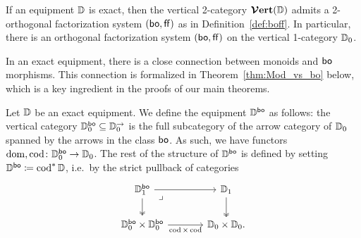 \documentclass[11pt,oneside,article]{memoir}
\begin{document}
\begin{theorem}\cite[Theorem~4.17]{Schultz2015}
    \label{thm:orthogonal}
  If an equipment $\mathbb{D}$ is exact, then the vertical 2-category $\bm{\mathcal{V}}\mathbf{ert}(\mathbb{D})$ admits a
  2-orthogonal factorization system $(\mathsf{bo},\mathsf{ff})$ as in Definition~\ref{def:boff}. In particular,
  there is an orthogonal factorization system $(\mathsf{bo},\mathsf{ff})$ on the vertical 1-category $\mathbb{D}_0$.
\end{theorem}


In an exact equipment, there is a close connection between monoids and $\mathsf{bo}$ morphisms. This
connection is formalized in Theorem~\ref{thm:Mod_vs_bo} below, which is a key ingredient in the
proofs of our main theorems.

\begin{definition}
  Let $\mathbb{D}$ be an exact equipment. We define the equipment $\mathbb{D}^{\mathsf{bo}}$ as follows: the
  vertical category $\mathbb{D}_0^{\mathsf{bo}}\subseteq\mathbb{D}_0^{\rightarrow}$ is the full subcategory of the
  arrow category of $\mathbb{D}_0$ spanned by the arrows in the class $\mathsf{bo}$. As such, we have functors
  $\operatorname{dom},\operatorname{cod}\colon\mathbb{D}_0^{\mathsf{bo}}\to\mathbb{D}_0$. The rest of the structure of $\mathbb{D}^{\mathsf{bo}}$ is
  defined by setting $\mathbb{D}^{\mathsf{bo}}\coloneqq\operatorname{cod}^*\mathbb{D}$, i.e.\ by the strict pullback of
  categories
  \[ \begin{tikzcd}[column sep=large]
    \dcat{D}_1^{\bo} \ar[r] \ar[d, two heads] \ar[dr,phantom,"\lrcorner" very near start]
      & \dcat{D}_1 \ar[d, two heads] \\
    \dcat{D}_0^{\bo}\times\dcat{D}_0^{\bo} \ar[r,"\cod\times\cod"']
      & \dcat{D}_0\times\dcat{D}_0.
  \end{tikzcd} \]
\end{definition}
\end{document}
